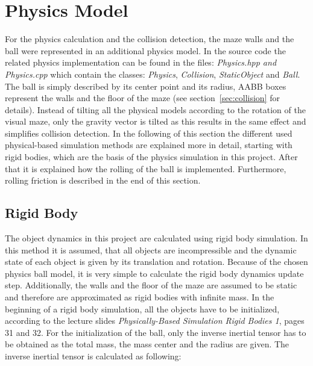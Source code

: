 \documentclass[11pt,a4paper]{article}
\begin{document}
\section{Physics Model}
\label{sec:physics}
For the physics calculation and the collision detection, the maze walls and the ball were represented in an additional physics model. In the source code the related physics implementation can be found in the files: \emph{Physics.hpp and Physics.cpp} which contain the classes: \emph{Physics}, \emph{Collision}, \emph{StaticObject} and \emph{Ball}. The ball is simply described by its center point and its radius, AABB boxes represent the walls and the floor of the maze (see section~\ref{sec:collision} for details). Instead of tilting all the physical models according to the rotation of the visual maze, only the gravity vector is tilted as this results in the same effect and simplifies collision detection. In the following of this section the different used physical-based simulation methods are explained more in detail, starting with rigid bodies, which are the basis of the physics simulation in this project. After that it is explained how the rolling of the ball is implemented. Furthermore, rolling friction is described in the end of this section. 

\subsection{Rigid Body}
\label{subsec:rigid}
The object dynamics in this project are calculated using rigid body simulation. In this method it is assumed, that all objects are incompressible and the dynamic state of each object is given by its translation and rotation. 
Because of the chosen physics ball model, it is very simple to calculate the rigid body dynamics update step. Additionally, the walls and the floor of the maze are assumed to be static and therefore are approximated as rigid bodies with infinite mass. In the beginning of a rigid body simulation, all the objects have to be initialized, according to the lecture slides \emph{Physically-Based Simulation Rigid Bodies 1}, pages 31 and 32. For the initialization of the ball, only the inverse inertial tensor has to be obtained as the total mass, the mass center and the radius are given. The inverse inertial tensor is calculated as following:
\end{document}

